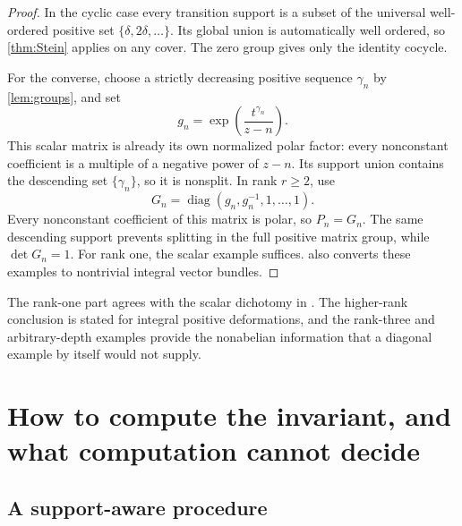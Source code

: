 \documentclass[11pt,letterpaper]{article}
\theoremstyle{definition}
\theoremstyle{remark}
\numberwithin{equation}{section}
\begin{document}
\begin{proof}
In the cyclic case every transition support is a subset of the universal well-ordered positive set $\{\delta,2\delta,\ldots\}$. Its global union is automatically well ordered, so \cref{thm:Stein} applies on any cover. The zero group gives only the identity cocycle.

For the converse, choose a strictly decreasing positive sequence $\gamma_n$ by \cref{lem:groups}, and set
\[
 g_n=\exp\left(\frac{t^{\gamma_n}}{z-n}\right).
\]
This scalar matrix is already its own normalized polar factor: every nonconstant coefficient is a multiple of a negative power of $z-n$. Its support union contains the descending set $\{\gamma_n\}$, so it is nonsplit. In rank $r\geq2$, use
\begin{equation}\label{eq:SLcounter}
 G_n=\operatorname{diag}(g_n,g_n^{-1},1,\ldots,1).
\end{equation}
Every nonconstant coefficient of this matrix is polar, so $P_n=G_n$. The same descending support prevents splitting in the full positive matrix group, while $\det G_n=1$. For rank one, the scalar example suffices.  also converts these examples to nontrivial integral vector bundles.
\end{proof}

The rank-one part agrees with the scalar dichotomy in \cite{RepoGlobal}. The higher-rank conclusion is stated for integral positive deformations, and the rank-three and arbitrary-depth examples provide the nonabelian information that a diagonal example by itself would not supply.

\section{How to compute the invariant, and what computation cannot decide}\label{sec:computation}

\subsection{A support-aware procedure}
\end{document}
